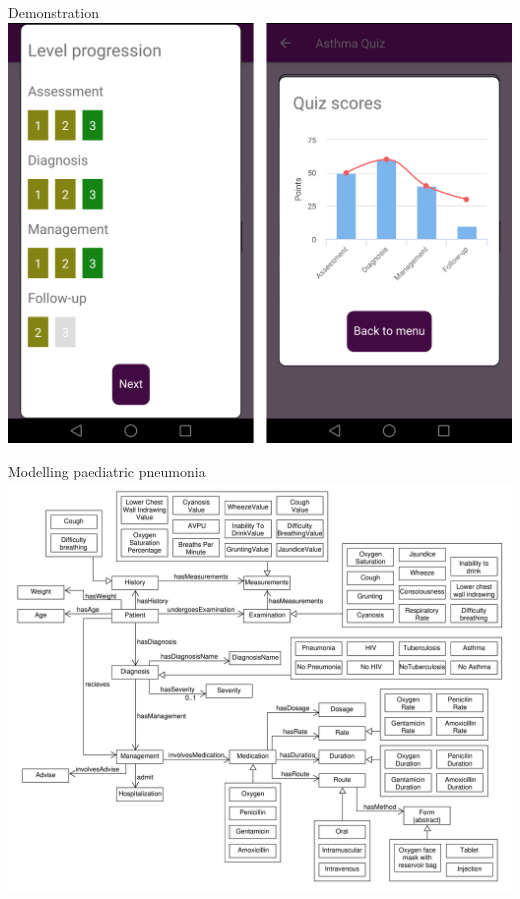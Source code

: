 \documentclass{beamer}
\begin{document}
\begin{frame}{Demonstration}
\includegraphics[scale=0.16]{Montage6}
\end{frame}

\begin{frame}{Modelling paediatric pneumonia}
\includegraphics[scale=0.27]{Pneumonia}
\end{frame}
\end{document}

